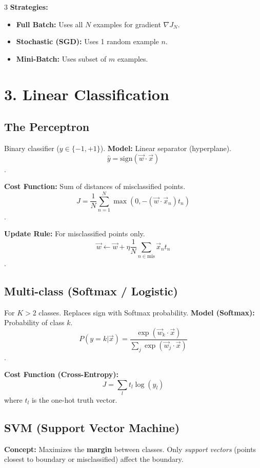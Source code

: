 \documentclass[10pt, a4paper, landscape]{article}
\begin{document}
\begin{multicols*}{3}
\textbf{Strategies:}
\begin{itemize}
    \item \textbf{Full Batch:} Uses all $N$ examples for gradient $\nabla J_N$.
    \item \textbf{Stochastic (SGD):} Uses 1 random example $n$.
    \item \textbf{Mini-Batch:} Uses subset of $m$ examples.
\end{itemize}

\section{3. Linear Classification}
\subsection{The Perceptron}
Binary classifier ($y \in \{-1, +1\}$).
\textbf{Model:} Linear separator (hyperplane).
$$ \hat{y} = \text{sign}(\vec{w} \cdot \vec{x}) $$
.

\textbf{Cost Function:} Sum of distances of misclassified points.
$$ J = \frac{1}{N} \sum_{n=1}^{N} \max(0, -(\vec{w} \cdot \vec{x}_n) t_n) $$
.

\textbf{Update Rule:} For misclassified points only.
$$ \vec{w} \leftarrow \vec{w} + \eta \frac{1}{N} \sum_{n \in \text{mis}} \vec{x}_n t_n $$
.

\subsection{Multi-class (Softmax / Logistic)}
For $K > 2$ classes. Replaces sign with Softmax probability.
\textbf{Model (Softmax):} Probability of class $k$.
$$ P(y=k|\vec{x}) = \frac{\exp(\vec{w}_k \cdot \vec{x})}{\sum_j \exp(\vec{w}_j \cdot \vec{x})} $$
.

\textbf{Cost Function (Cross-Entropy):}
$$ J = \sum_{l} t_l \log(\hat{y}_l) $$
where $t_l$ is the one-hot truth vector.

\subsection{SVM (Support Vector Machine)}
\textbf{Concept:} Maximizes the \textbf{margin} between classes.
Only \textit{support vectors} (points closest to boundary or misclassified) affect the boundary.


\end{multicols*}
\end{document}
